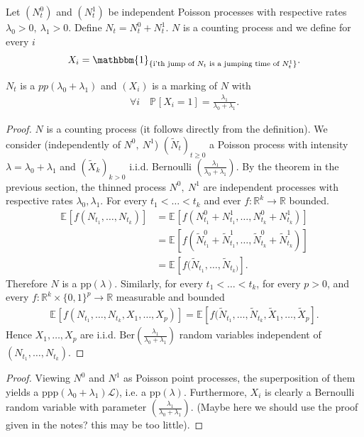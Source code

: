 Let $(N_t^0)$ and $(N_t^1)$ be independent Poisson processes with respective rates $\lambda_0> 0,\ \lambda_1> 0$. Define $N_t = N_t^0 + N_t^1$. $N$ is a counting process and we define for every $i$ 
\begin{align}
	X_i = \mathbbm{1}_{\{\textrm{i'th jump of }N_t\textrm{ is a jumping time of }N_t^1\}}.
\end{align}
\begin{theorem}[Superposition]
$N_t$ is a $pp(\lambda_0 + \lambda_1)$ and  $(X_i)$ is a marking of $N$ with 
\begin{align}
	\boxed{	\forall i\quad \mathbb{P}_{} \left[ X_i=1 \right] = \frac{\lambda_1}{\lambda_0+\lambda_1}.}
\end{align}
\end{theorem}
\begin{proof}
	$N$ is a counting process (it follows directly from the definition).
	We consider (independently of $N^{0},\ N^1$) $(\widetilde{N}_{t})_{t\geq 0}$ a Poisson process with intensity $\lambda = \lambda _0 + \lambda _1$ and $(\widetilde{X}_k)_{k> 0}$ i.i.d. Bernoulli $\left( \frac{\lambda _1}{\lambda _0 + \lambda _1}\right)$. By the theorem in the previous section, the thinned process $N^{0},\ N^{1}$ are independent processes with respective rates $\lambda _0, \lambda _1$. For every $t_1 < \ldots < t_k$ and ever $f:\mathbb{R}^{k}\to \mathbb{R} $ bounded.
	\begin{align}
		\mathbb{E}_{} \left[ f(N_{t_1},\ldots, N_{t_k}) \right] 
		&= \mathbb{E}_{} \left[  f(N_{t_1}^{0}+ N_{t_1}^{1}, \ldots , N_{t_k}^{0}+ N_{t_k}^{1})\right] \\
		&= \mathbb{E}_{} \left[ f( \widetilde{N}_{t_1}^{0}+ \widetilde{N} _{t_1}^{1}, \ldots , \widetilde{N} _{t_k}^{0} + \widetilde{N} _{t_k}^{1}) \right] \\
		&= \mathbb{E}_{} \left[ f( \widetilde{N} _{t_1}, \ldots , \widetilde{N} _{t_k)} \right]. 
	\end{align}
	Therefore $N$ is a $ \textrm{pp} (\lambda )$. Similarly, for every $t_1 < \ldots < t_k$, for every $p> 0$, and every $f:\mathbb{R}^{k}\times \{0,1\}^{p}\to \mathbb{R}$ measurable and bounded
	\begin{align}
	\mathbb{E}_{} \left[ f(N_{t_1}, \ldots , N_{t_k}, X_1, \ldots , X_p) \right] = \mathbb{E}_{} \left[ f(\widetilde{N} _{t_1}, \ldots , \widetilde{N} _{t_k}, \widetilde{X} _{1}, \ldots, \widetilde{X} _{p} \right] .
	\end{align}
	Hence $X_1, \ldots, X_p$ are i.i.d. $ \textrm{Ber} \left(\frac{\lambda _1}{\lambda _0 + \lambda _1}\right)$ random variables independent of $(N_{t_1}, \ldots , N_{t_k})$.
\end{proof}
{\color{blue}
\begin{proof}
	Viewing $N^{0}$ and $N^{1}$ as Poisson point processes, the superposition of them yields a $ \textrm{ppp} (\lambda_0 + \lambda_1) \mathcal{L})$, i.e. a $ \textrm{pp} (\lambda )$. 
	Furthermore, $X_i$ is clearly a Bernoulli random variable with parameter $\left( \frac{ \lambda _1}{\lambda_0 + \lambda_1}\right) $. (Maybe here we should use the proof given in the notes? this may be too little).
\end{proof}
}

